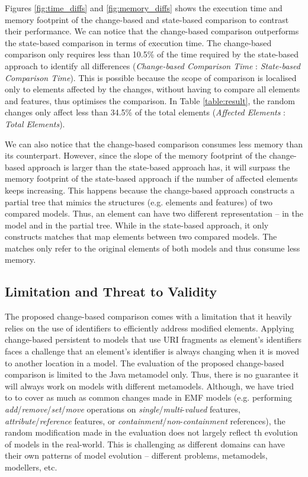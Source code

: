 \documentclass{llncs}
\begin{document}
Figures \ref{fig:time_diffs} and \ref{fig:memory_diffs} shows the execution time and memory footprint of the change-based and state-based comparison to contrast their performance. We can notice that the change-based comparison outperforms the state-based comparison in terms of execution time. The change-based comparison only requires less than 10.5\% of the time required by the state-based approach to identify all differences (\textit{Change-based Comparison Time} : \textit{State-based Comparison Time}). This is possible because the scope of comparison is localised only to elements affected by the changes, without having to compare all elements and features, thus optimises the comparison. In Table \ref{table:result}, the random changes only affect less than 34.5\% of the total elements (\textit{Affected Elements} : \textit{Total Elements}).

We can also notice that the change-based comparison consumes less memory than its counterpart. However, since the slope of the memory footprint of the change-based approach is larger than the state-based approach has, it will surpass the memory footprint of the state-based approach if the number of affected elements keeps increasing. This happens because the change-based approach constructs a partial tree that mimics the structures (e.g. elements and features) of two compared models. Thus, an element can have two different representation -- in the model and in the partial tree. While in the state-based approach, it only constructs matches that map elements between two compared models. The matches only refer to the original elements of both models and thus consume less memory. 

\subsection{Limitation and Threat to Validity}
\label{sec:limitation_and_Threat_to_validity}

The proposed change-based comparison comes with a limitation that it heavily relies on the use of identifiers to efficiently address modified elements. Applying change-based persistent to models that use URI fragments as element's identifiers faces a challenge that an element's identifier is always changing when it is moved to another location in a model. The evaluation of the proposed change-based comparison is limited to the Java metamodel only. Thus, there is no guarantee it will always work on models with different metamodels. Although, we have tried to to cover as much as common changes made in EMF models (e.g. performing \textit{add}/\textit{remove}/\textit{set}/\textit{move} operations on \textit{single}/\textit{multi}-\textit{valued} features, \textit{attribute}/\textit{reference} features, or \textit{containment}/\textit{non}-\textit{containment} references), the random modification made in the evaluation does not largely reflect th evolution of models in the real-world. This is challenging as different domains can have their own patterns of model evolution -- different problems, metamodels, modellers, etc.
\end{document}

